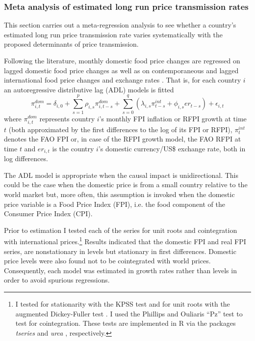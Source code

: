 \documentclass[12pt,english]{article}
\begin{document}
\subsubsection{Meta analysis of estimated long run price transmission rates\label{sec:meta-analysis}}
This section carries out a meta-regression analysis to see whether a country's estimated long run price transmission rate varies systematically with the proposed determinants of price transmission.

Following the literature, monthly domestic food price changes are regressed on lagged domestic food price changes as well as on contemporaneous and lagged international food price changes and exchange rates \citep[see][]{Ianchovichina2014, IMF2011, Kalkuhl2014}. That is, for each country $i$ an autoregressive distributive lag (ADL) models is fitted
\begin{equation}
\pi_{i,t}^{dom}=\delta_{i,0}+\sum_{s=1}^{p}\rho_{i,s}\pi_{i,t-s}^{dom}+\sum_{s=0}^{q}(\lambda_{i,s}\pi_{t-s}^{int}+\phi_{i,s}er_{t-s})+\epsilon_{i,t}\label{eq:time_series_model}
\end{equation}
where $\pi_{i,t}^{dom}$ represents country $i$'s monthly FPI inflation or RFPI growth at time $t$ (both approximated by the first differences to the log of its FPI or RFPI), $\pi_{t}^{int}$ denotes the FAO FPI or, in case of the RFPI growth model, the FAO RFPI at time $t$ and $er_{i,t}$ is the country $i$'s domestic currency/US\$ exchange rate, both in log differences.

The ADL model is appropriate when the causal impact is unidirectional. This could be the case when the domestic price is from a small country relative to the world market but, more often, this assumption is invoked when the domestic price variable is a Food Price Index (FPI), i.e. the food component of the Consumer Price Index (CPI). 

Prior to estimation I tested each of the series for unit roots and cointegration with international prices.\footnote{I tested for stationarity with the KPSS test \citep{kwiatkowski92} and for unit roots with the augmented Dickey-Fuller test \citep{dickey79}. I used the Phillips and Ouliaris ``Pz'' test \citep{phillips90} to test for cointegration. These tests are implemented in \textsf{R} via the packages \emph{tseries} \citep{trapletti15} and \emph{urca} \citep{pfaff08}, respectively.} Results indicated that the domestic FPI and real FPI series, are nonstationary in levels but stationary in first differences. Domestic price levels were also found not to be cointegrated with world prices. Consequently, each model was estimated in growth rates rather than levels in order to avoid spurious regressions.
\end{document}
